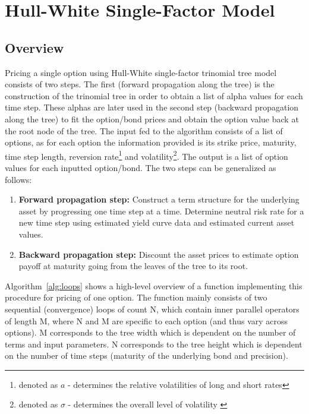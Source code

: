 \chapter{Hull-White Single-Factor Model}
\label{chapter:hullwhitemodel}

\section{Overview}
Pricing a single option using Hull-White single-factor trinomial tree model consists of two steps. The first (forward propagation along the tree) is the construction of the trinomial tree in order to obtain a list of alpha values for each time step. These alphas are later used in the second step (backward propagation along the tree) to fit the option/bond prices and obtain the option value back at the root node of the tree. The input fed to the algorithm consists of a list of options, as for each option the information provided is its strike price, maturity, time step length, reversion rate\footnote{denoted as $a$ - determines the relative volatilities of long and short rates\cite[pg.9]{npfits}} and volatility\footnote{denoted as $\sigma$ - determines the overall level of volatility \cite[pg. 9]{npfits}}. The output is a list of option values for each inputted option/bond. The two steps can be generalized as follows: 

\begin{enumerate}
    \item \textbf{Forward propagation step:} Construct a term structure for the underlying asset by progressing one time step at a time. Determine neutral risk rate for a new time step using estimated yield curve data and estimated current asset values.
    \item \textbf{Backward propagation step:} Discount the asset prices to estimate option payoff at maturity going from the leaves of the tree to its root. 
\end{enumerate}

Algorithm~\ref{alg:loops} shows a high-level overview of a function implementing this procedure for pricing of one option. The function mainly consists of two sequential (convergence) loops of count N, which contain inner parallel operators of length M, where N and M are specific to each option (and thus vary across options). M corresponds to the tree width which is dependent on the number of terms and input parameters. N corresponds to the tree height which is dependent on the number of time steps (maturity of the underlying bond and precision).

